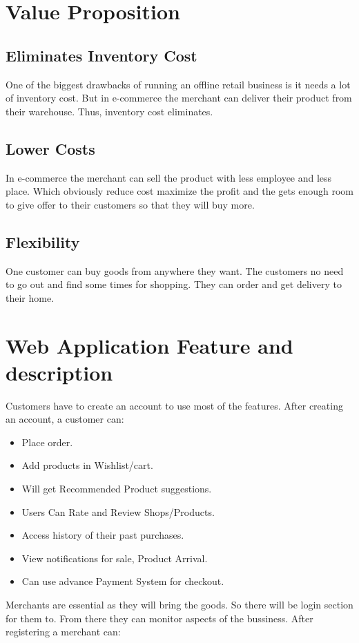 \documentclass{article}
\begin{document}
\section{Value Proposition}

\subsection{Eliminates Inventory Cost}
One of the biggest drawbacks of running an offline retail business is it needs a lot of inventory cost. But in e-commerce the merchant can deliver their product from their warehouse. Thus, inventory cost eliminates. 

\subsection{Lower Costs}
In e-commerce the merchant can sell the product with less employee and less place. Which obviously reduce cost maximize the profit and the gets enough room to give offer to their customers so that they will buy more. 

\subsection{Flexibility}
One customer can buy goods from anywhere they want. The customers no need to go out and find some times for shopping. They can order and get delivery to their home.


\section{Web Application Feature and description}
Customers have to create an account to use most of the features. After creating an account, a customer can: 
\begin{itemize}
\item Place order.
\item Add products in Wishlist/cart.
\item Will get Recommended Product suggestions. 
\item Users Can Rate and Review Shops/Products.
\item Access history of their past purchases.
\item View notifications for sale, Product Arrival.
\item Can use advance Payment System for checkout.
\end{itemize}

        \vspace*{0.5 cm}
Merchants are essential as they will bring the goods. So there will be login section for them to. From there they can monitor aspects of the bussiness.  After registering a merchant can:
\end{document}
